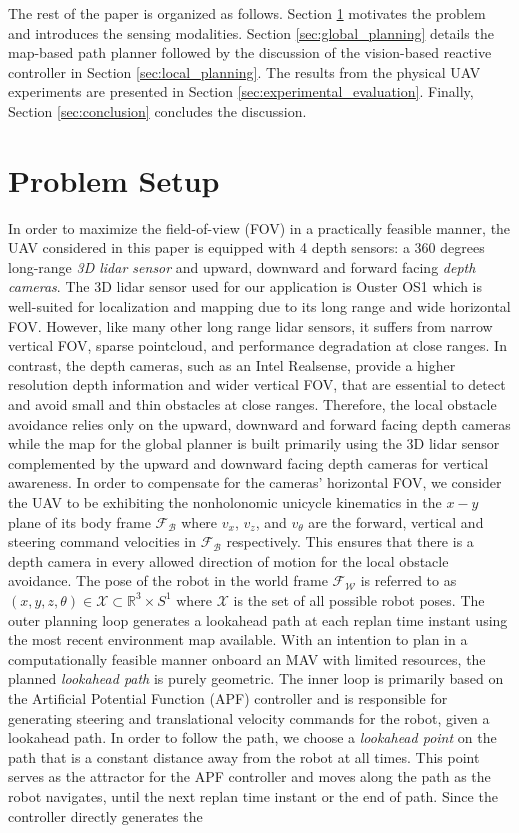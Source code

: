 \documentclass[letterpaper, 10 pt, conference]{ieeeconf}  %
\begin{document}
The rest of the paper is organized as follows. Section \ref{sec:problem_setup} motivates the problem and introduces the sensing modalities. Section \ref{sec:global_planning} details the map-based path planner followed by the discussion of the vision-based reactive controller in Section \ref{sec:local_planning}. The results from the physical UAV experiments are presented in Section \ref{sec:experimental_evaluation}. Finally, Section \ref{sec:conclusion} concludes the discussion.

\section{Problem Setup}
\label{sec:problem_setup}

In order to maximize the field-of-view (FOV) in a practically feasible manner, the UAV considered in this paper is equipped with 4 depth sensors: a 360 degrees long-range \textit{3D lidar sensor} and upward, downward and forward facing \textit{depth cameras}. The 3D lidar sensor used for our application is Ouster OS1 which is well-suited for localization and mapping due to its long range and wide horizontal FOV. However, like many other long range lidar sensors, it suffers from narrow vertical FOV, sparse pointcloud, and performance degradation at close ranges. In contrast, the depth cameras, such as an Intel Realsense, provide a higher resolution depth information and wider vertical FOV, that are essential to detect and avoid small and thin obstacles at close ranges. Therefore, the local obstacle avoidance relies only on the upward, downward and forward facing depth cameras while the map for the global planner is built primarily using the 3D lidar sensor complemented by the upward and downward facing depth cameras for vertical awareness. In order to compensate for the cameras' horizontal FOV, we consider the UAV to be exhibiting the nonholonomic unicycle kinematics in the $x-y$ plane of its body frame $\mathcal{F}_{\mathcal{B}}$ where $v_x$, $v_z$, and $v_\theta$ are the forward, vertical and steering command velocities in $\mathcal{F}_{\mathcal{B}}$ respectively. This ensures that there is a depth camera in every allowed direction of motion for the local obstacle avoidance. The pose of the robot in the world frame $\mathcal{F}_{\mathcal{W}}$ is referred to as $(x,y,z,\theta) \in \mathcal{X} \subset \mathbb{R}^3 \times S^1$ where $\mathcal{X}$ is the set of all possible robot poses. The outer planning loop generates a lookahead path at each replan time instant using the most recent environment map available. With an intention to plan in a computationally feasible manner onboard an MAV with limited resources, the planned \textit{lookahead path} is purely geometric. The inner loop is primarily based on the Artificial Potential Function (APF) controller and is responsible for generating steering and translational velocity commands for the robot, given a lookahead path. In order to follow the path, we choose a \textit{lookahead point} on the path that is a constant distance away from the robot at all times. This point serves as the attractor for the APF controller and moves along the path as the robot navigates, until the next replan time instant or the end of path. Since the controller directly generates the 
\end{document}
